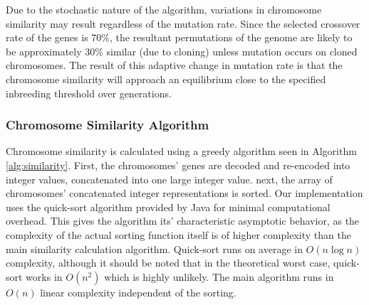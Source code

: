 \documentclass{sig-alternate}
\begin{document}
Due to the stochastic nature of the algorithm, variations in chromosome similarity may result regardless of the mutation rate. Since the selected crossover rate of the genes is 70\%, the resultant permutations of the genome are likely to be approximately 30\% similar (due to cloning) unless mutation occurs on cloned chromosomes. The result of this adaptive change in mutation rate is that the chromosome similarity will approach an equilibrium close to the specified inbreeding threshold over generations.

\subsubsection{Chromosome Similarity Algorithm}
Chromosome similarity is calculated using a greedy algorithm seen in Algorithm \ref{alg:similarity}. First, the chromosomes' genes are decoded and re-encoded into integer values, concatenated into one large integer value. next, the array of chromosomes' concatenated integer representations is sorted. Our implementation uses the quick-sort algorithm provided by Java for minimal computational overhead. This gives the algorithm its' characteristic asymptotic behavior, as the complexity of the actual sorting function itself is of higher complexity than the main similarity calculation algorithm. Quick-sort runs on average in $O(n \log n)$ complexity, although it should be noted that in the theoretical worst case, quick-sort works in $O(n^2)$ which is highly unlikely. The main algorithm runs in $O(n)$ linear complexity independent of the sorting.
\end{document}
